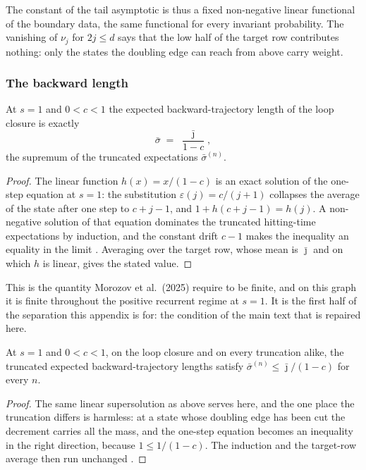 \noindent The constant of the tail asymptotic is thus a fixed non-negative linear functional of the
boundary data, the same functional for every invariant probability. The vanishing of $\nu_j$
for $2j\leq d$ says that the low half of the target row contributes nothing: only the states
the doubling edge can reach from above carry weight.


\subsubsection{The backward length}


\begin{theorem}
  \label{thm:main_sigmaBar_eq}
At $s=1$ and $0<c<1$ the expected backward-trajectory length of the loop closure is exactly
\[ \bar\sigma \;=\; \frac{\bar\jmath}{1-c}, \]
the supremum of the truncated expectations $\bar\sigma^{(n)}$.
\end{theorem}

\begin{proof}
The linear function $h(x)=x/(1-c)$ is an exact solution of the one-step equation at $s=1$: the
substitution $\varepsilon(j)=c/(j+1)$ collapses the average of the state after one step to
$c+j-1$, and $1+h(c+j-1)=h(j)$. A non-negative solution of that equation dominates the
truncated hitting-time expectations by induction, and the constant drift $c-1$ makes the
inequality an equality in the limit . Averaging over the
target row, whose mean is $\bar\jmath$ and on which $h$ is linear, gives the stated value.
\end{proof}

\noindent This is the quantity Morozov et al.\ (2025) require to be finite, and on this graph it is
finite throughout the positive recurrent regime at $s=1$. It is the first half of the
separation this appendix is for: the condition of the main text that is repaired here.


\begin{theorem}
  \label{thm:main_sigmaBar_le}
At $s=1$ and $0<c<1$, on the loop closure and on every truncation alike, the truncated expected
backward-trajectory lengths satisfy $\bar\sigma^{(n)}\leq\bar\jmath/(1-c)$ for every $n$.
\end{theorem}

\begin{proof}
The same linear supersolution as above serves here, and the one place the truncation differs is
harmless: at a state whose doubling edge has been cut the decrement carries all the mass, and
the one-step equation becomes an inequality in the right direction, because $1\leq1/(1-c)$. The
induction and the target-row average then run unchanged .
\end{proof}

